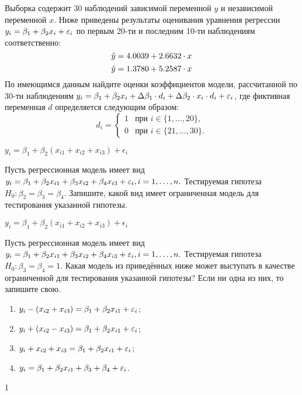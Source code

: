 \begin{problem} %
 Выборка содержит 30 наблюдений зависимой переменной $y$ и независимой переменной $x$. Ниже приведены результаты оценивания уравнения регрессии $y_i=\beta_1+\beta_2 x_i+\varepsilon_i$ по первым 20-ти и последним 10-ти наблюдениям соответственно:
\[
\hat{y}=4.0039+2.6632\cdot{x}
\]
\[
\hat{y}=1.3780+5.2587\cdot{x}
\]
По имеющимся данным найдите оценки коэффициентов  модели, рассчитанной по 30-ти наблюдениям $y_i=\beta_1+\beta_2 x_i+\Delta{\beta_1} \cdot{d_i} + \Delta{\beta_2} \cdot{x_i} \cdot{d_i}+\varepsilon_i$, где фиктивная переменная $d$ определяется следующим образом:
\[
d_i =
  \begin{cases}
    1 & \text{при } i \in \bigl\{ 1,\dots,20 \bigr\} , \\
    0 & \text{при } i \in \bigl\{ 21,\dots,30 \bigr\} .
 \end{cases}
\]


\begin{sol}
$y_i=\beta_1+\beta_2(x_{i1}+x_{i2}+x_{i3})+\epsilon_{i}$
\end{sol}
\end{problem}



\begin{problem} %
 Пусть регрессионная модель имеет вид $y_i=\beta_1+\beta_2 x_{i1}+\beta_3 x_{i2}+\beta_4 x_{i3}+\varepsilon_i, i=1,\dots,n.$ Тестируемая гипотеза $H_0: \beta_2=\beta_3=\beta_4.$ Запишите, какой вид имеет ограниченная модель для тестирования указанной гипотезы.

\begin{sol}
$y_i=\beta_1+\beta_2(x_{i1}+x_{i2}+x_{i3})+\epsilon_{i}$
\end{sol}
\end{problem}



\begin{problem} %
Пусть регрессионная модель имеет вид $y_i= \beta_1+ \beta_2 x_{i1}+ \beta_3 x_{i2}+ \beta_4 x_{i3}+\varepsilon_i, i=1,\dots,n.$ Тестируемая гипотеза $H_0: \beta_3= \beta_4=1.$ Какая модель из приведённых ниже может выступать в качестве ограниченной для тестирования указанной гипотезы? Если ни одна из них, то запишите свою.
\begin{enumerate}
\item $y_i-(x_{i2}+x_{i3}) = \beta_1+ \beta_2 x_{i1}+ \varepsilon_i$;
\item $y_i+(x_{i2}-x_{i3}) = \beta_1+ \beta_2 x_{i1}+ \varepsilon_i$;
\item $y_i+x_{i2}+x_{i3} = \beta_1+ \beta_2 x_{i1}+ \varepsilon_i$;
\item $y_i= \beta_1+ \beta_2 x_{i1}+ \beta_3 + \beta_4 + \varepsilon_i$.
\end{enumerate}


\begin{sol}
1
\end{sol}
\end{problem}





